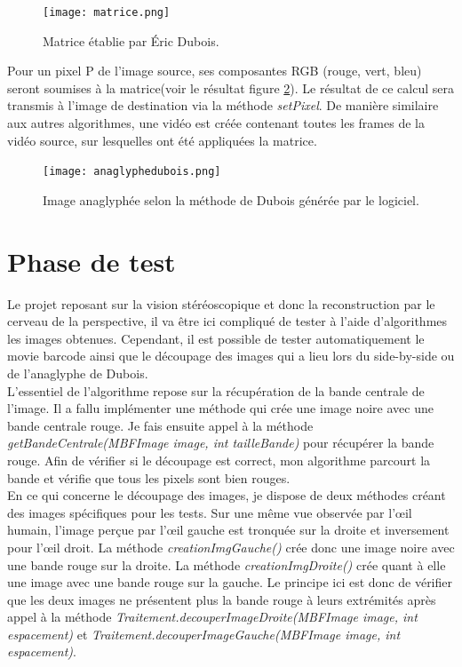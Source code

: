 \documentclass[10pt,a4paper]{article}
\begin{document}
\begin{figure}[!h]
\center
\texttt{[image: matrice.png]}
\caption{Matrice établie par Éric Dubois.}
\label{matrice}
\end{figure}

Pour un pixel P de l'image source, ses composantes RGB (rouge, vert, bleu) seront soumises à la matrice(voir le résultat figure \ref{anadubois}). Le résultat de ce calcul sera transmis à l'image de destination via la méthode \textit{setPixel}. De manière similaire aux autres algorithmes, une vidéo est créée contenant toutes les frames de la vidéo source, sur lesquelles ont été appliquées la matrice.\\

\begin{figure}[!h]
\center
\texttt{[image: anaglyphedubois.png]}
\caption{Image anaglyphée selon la méthode de Dubois générée par le logiciel.}
\label{anadubois}
\end{figure}  

\newpage
\section{Phase de test}

Le projet reposant sur la vision stéréoscopique et donc la reconstruction par le cerveau de la perspective, il va être ici compliqué de tester à l'aide d'algorithmes les images obtenues. Cependant, il est possible de tester automatiquement le movie barcode ainsi que le découpage des images qui a lieu lors du side-by-side ou de l'anaglyphe de Dubois.\\ 

L'essentiel de l'algorithme repose sur la récupération de la bande centrale de l'image. Il a fallu implémenter une méthode qui crée une image noire avec une bande centrale rouge. Je fais ensuite appel à la méthode \textit{getBandeCentrale(MBFImage image, int tailleBande)} pour récupérer la bande rouge. Afin de vérifier si le découpage est correct, mon algorithme parcourt la bande et vérifie que tous les pixels sont bien rouges.\\ 

En ce qui concerne le découpage des images, je dispose de deux méthodes créant des images spécifiques pour les tests. Sur une même vue observée par l'œil humain, l'image perçue par l'œil gauche est tronquée sur la droite et inversement pour l'œil droit. La méthode \textit{creationImgGauche()} crée donc une image noire avec une bande rouge sur la droite. La méthode \textit{creationImgDroite()} crée quant à elle une image avec une bande rouge sur la gauche. Le principe ici est donc de vérifier que les deux images ne présentent plus la bande rouge à leurs extrémités après appel à la méthode \textit{Traitement.decouperImageDroite(MBFImage image, int espacement)} et \textit{Traitement.decouperImageGauche(MBFImage image, int espacement)}.
\end{document}
